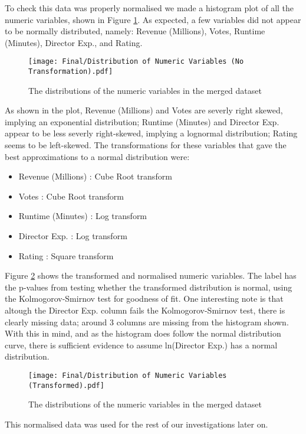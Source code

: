         To check this data was properly normalised we made a histogram plot of all the numeric variables, shown in Figure \ref*{fig-distribution-of-numeric-variable}.
        As expected, a few variables did not appear to be normally distributed, namely: Revenue (Millions), Votes, Runtime (Minutes), 
            Director Exp., and Rating.
        \begin{figure}[H]
            \centering
            \texttt{[image: Final/Distribution of Numeric Variables (No Transformation).pdf]}
            \caption[short]{The distributions of the numeric variables in the merged dataset}\label{fig-distribution-of-numeric-variable}
        \end{figure}
        As shown in the plot, Revenue (Millions) and Votes are severly right skewed, implying an exponential distribution;
        Runtime (Minutes) and Director Exp. appear to be less severly right-skewed, implying a lognormal distribution;
        Rating seems to be left-skewed.
        The transformations for these variables that gave the best approximations to a normal distribution were:
        \begin{multicols}{2}
            \begin{itemize}
                \item Revenue (Millions) : Cube Root transform
                \item Votes              : Cube Root transform
                \item Runtime (Minutes)  : Log transform
                \item Director Exp.      : Log transform
                \item Rating             : Square transform
            \end{itemize}
        \end{multicols}
        Figure \ref*{fig-transformed-distribution-of-numeric-variable} shows the transformed and normalised numeric variables.
        The label has the p-values from testing whether the transformed distribution is normal, using the Kolmogorov-Smirnov
            test\cite*{KStest} for goodness of fit.
        One interesting note is that altough the Director Exp. column fails the Kolmogorov-Smirnov test, there is clearly missing
            data; around 3 columns are missing from the histogram shown.
        With this in mind, and as the histogram does follow the normal distribution curve, there is sufficient evidence to assume
            ln(Director Exp.) has a normal distribution.
        \begin{figure}[H]
            \centering
            \texttt{[image: Final/Distribution of Numeric Variables (Transformed).pdf]}
            \caption[short]{The distributions of the numeric variables in the merged dataset}\label{fig-transformed-distribution-of-numeric-variable}
        \end{figure}
        This normalised data was used for the rest of our investigations later on.
